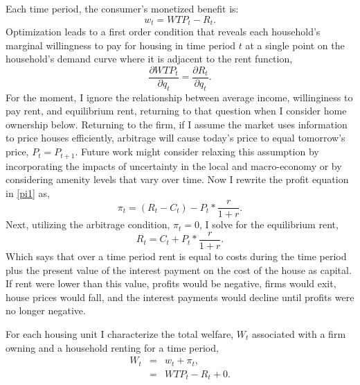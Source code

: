 \documentclass[ecta,nameyear,draft]{econsocart}
\theoremstyle{plain}
\theoremstyle{remark}
\begin{document}
Each time period, the consumer’s monetized benefit is:
\begin{equation*}
	 w_t=\mathit{WTP}_t-R_t.
\end{equation*}
Optimization leads to a first order condition that reveals each household's marginal willingness
to pay for housing in time period $t$ at a single point on the household’s demand curve where it is adjacent to the rent function,
\begin{equation}
	\frac{\partial \mathit{WTP}_t}{\partial q_t}=\frac{\partial R_t}{\partial q_t} \label{foc}.
\end{equation}
For the moment, I ignore the relationship between average income, willinginess to pay rent, and equilibrium rent, returning to that question when I consider home ownership below. Returning to the firm, if I assume the market uses information to price houses efficiently, arbitrage will cause today’s price to equal tomorrow’s price, $P_t=P_{t+1}$. Future work might consider relaxing this assumption by incorporating the impacts of uncertainty in the local and macro-economy or by considering amenity levels that vary over time. Now I rewrite the profit equation in \ref{pi1} as,
\begin{equation}
	\pi_t=(R_t-C_t)-P_t*\frac{r}{1+r}.\label{pi1.1}
\end{equation}
Next, utilizing the arbitrage condition, $\pi_t=0$, I solve for the equilibrium rent,
\begin{equation*}
	R_t=C_t+P_t*\frac{r}{1+r}.
\end{equation*}
Which says that over a time period rent is equal to costs during the time period plus the present value of
the interest payment on the cost of the house as capital. If rent were lower than this value, profits
would be negative, firms would exit, house prices would fall, and the interest payments would decline until profits were no longer negative.

For each housing unit I characterize the total welfare, $W_t$ associated with a firm owning and a household renting for a time period,
\begin{eqnarray*}
	W_t & = & w_t+\pi_t,\\
	& = & \mathit{WTP}_t-R_t+0.
\end{eqnarray*}
\end{document}
